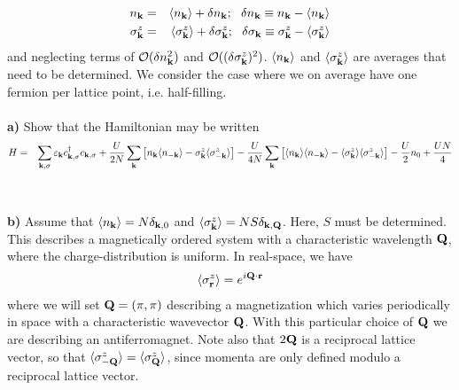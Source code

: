 \begin{problem}
\begin{eqnarray}
	n_{\bf k} & = & \langle n_{\bf k} \rangle + \delta n_{\bf k}; ~~  \delta n_{\bf k} \equiv n_{\bf k} - \langle n_{\bf k} \rangle \nonumber  \\
	\sigma^z_{\bf k} & = & \langle \sigma^z_{\bf k} \rangle + \delta \sigma^z_{\bf k}; ~~  \delta \sigma_{\bf k} \equiv \sigma^z_{\bf k} - \langle \sigma^z_{\bf k} \rangle \nonumber  
\end{eqnarray}
and neglecting terms of ${\cal O}(\delta n_{\bf k}^2) $ and  ${\cal O}((\delta \sigma^z_{\bf k})^2) $.
$\langle n_{\bf k} \rangle$  and $\langle \sigma^z_{\bf k} \rangle$ are averages that need to be determined. We consider the case where we on average have one fermion per lattice point, i.e. half-filling.
\ \\
\ \\
{\bf a)} Show that the Hamiltonian may be written 
\begin{eqnarray}
	H & = & \sum_{{\bf k},\sigma}{ \varepsilon_{{\bf k}}}  c^{\dagger}_{{\bf k},\sigma} c_{{\bf k},\sigma}
	+ \frac{U}{2N} \sum_{{\bf k}} 
	\left[ n_{\bf k}  \langle n_{-\bf k} \rangle   - \sigma^z_{\bf k}  \langle \sigma^z_{-\bf k} \rangle  \right]  
	-   \frac{U}{4N} \sum_{{\bf k}} 
	\left[ \langle n_{\bf k} \rangle  \langle  n_{-\bf k} \rangle   - \langle  \sigma^z_{\bf k} \rangle \langle \sigma^z_{-\bf k} \rangle  \right] 
	- \frac{U}{2}  n_{0}
	+\frac{U N}{4}
	\nonumber
\end{eqnarray}
\ \\
\ \\
{\bf b)} Assume that $\langle n_{\bf k} \rangle = N \delta_{{\bf k},0}$ and $ \langle \sigma^z_{\bf k} \rangle =  N S \delta_{{\bf k},{\bf Q}}$. Here, $S$ must be determined. This describes a magnetically ordered system with a characteristic wavelength ${\bf Q}$, where the charge-distribution is uniform. In real-space, we have
\begin{eqnarray}
	\langle \sigma^z_{\bf r} \rangle = e^{i {\bf Q} \cdot {\bf r}} \nonumber
\end{eqnarray}  
where we will set ${\bf Q}=(\pi,\pi)$
describing a magnetization which varies periodically in space with a characteristic wavevector ${\bf Q}$.  With this particular choice of ${\bf Q}$
we are describing an antiferromagnet. Note also that $2 {\bf Q}$ is a reciprocal lattice vector, so that 
$\langle  \sigma^z_{-\bf Q} \rangle  = \langle \sigma^z_{\bf Q} \rangle $, since momenta are only defined modulo a reciprocal lattice vector.
\ \\

\end{problem}
